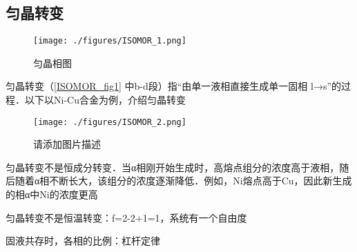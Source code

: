 
\subsection{匀晶转变}

\begin{figure}[ht]
\centering
\texttt{[image: ./figures/ISOMOR\_1.png]}
\caption{匀晶相图} \label{ISOMOR_fig1}
\end{figure}

匀晶转变（\autoref{ISOMOR_fig1} 中b-d段）指“由单一液相直接生成单一固相 l→s”的过程．以下以Ni-Cu合金为例，介绍匀晶转变
\begin{figure}[ht]
\centering
\texttt{[image: ./figures/ISOMOR\_2.png]}
\caption{请添加图片描述} \label{ISOMOR_fig2}
\end{figure}
匀晶转变不是恒成分转变．当α相刚开始生成时，高熔点组分的浓度高于液相，随后随着α相不断长大，该组分的浓度逐渐降低．例如，Ni熔点高于Cu，因此新生成的相α中Ni的浓度更高

匀晶转变不是恒温转变：f=2-2+1=1，系统有一个自由度

固液共存时，各相的比例：杠杆定律

